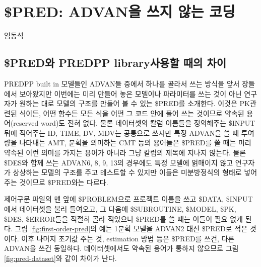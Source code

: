 \documentclass[
  11pt,
  krantz2, a4paper, twoside]{krantz}
\theoremstyle{definition}
\theoremstyle{definition}
\theoremstyle{definition}
\theoremstyle{remark}
\begin{document}
\hypertarget{PRED}{%
\chapter{\$PRED: ADVAN을 쓰지 않는 코딩}\label{PRED}}


\Large\hfill

임동석
\normalsize

\hypertarget{preduxc640-predpp-libraryuxc0acuxc6a9uxd560-uxb54cuxc758-uxcc28uxc774}{%
\section{\$PRED와 PREDPP library사용할 때의 차이}\label{preduxc640-predpp-libraryuxc0acuxc6a9uxd560-uxb54cuxc758-uxcc28uxc774}}


PREDPP built in 모델들인 ADVAN들 중에서 하나를 골라서 쓰는 방식을 앞서 장들에서 보아왔지만 이번에는 미리 만들어 놓은 모델이나 파라미터를 쓰는 것이 아닌 연구자가 원하는 대로 모델의 구조를 만들어 볼 수 있는 \$PRED를 소개한다. 이것은 PK관련된 식이든, 어떤 함수든 모든 식을 어떤 그 코드 안에 풀어 쓰는 것이므로 약속된 용어(reserved word)도 전혀 없다. 물론 데이터셋의 칼럼 이름들을 정의해주는 \$INPUT 뒤에 적어주는 ID, TIME, DV, MDV는 공통으로 쓰지만 특정 ADVAN을 쓸 때 투여량을 나타내는 AMT, 분획을 의미하는 CMT 등의 용어들은 \$PRED를 쓸 때는 미리 약속된 이런 의미를 가지는 용어가 아니라 그냥 칼럼의 제목에 지나지 않는다. 물론 \$DES와 함께 쓰는 ADVAN6, 8, 9, 13의 경우에도 특정 모델에 얽매이지 않고 연구자가 상상하는 모델의 구조를 주고 테스트할 수 있지만 이들은 미분방정식의 형태로 넣어주는 것이므로 \$PRED와는 다르다.

제어구문 파일의 맨 앞에 \$PROBLEM으로 프로젝트 이름을 쓰고 \$DATA, \$INPUT에서 데이터셋을 불러 들여오고, 그 다음에 \$SUBROUTINE, \$MODEL, \$PK, \$DES, \$ERROR들을 적절히 골라 적었으나 \$PRED를 쓸 때는 이들이 필요 없게 된다. 그림 \ref{fig:first-order-pred}의 예는 1분획 모델을 ADVAN2 대신 \$PRED로 적은 것이다. 이후 나머지 초기값 주는 것, estimation 방법 등은 \$PRED를 쓰건, 다른 ADVAN을 쓰건 동일하다. 데이터셋에서도 약속된 용어가 통하지 않으므로 그림 \ref{fig:pred-dataset}와 같이 차이가 난다.
\end{document}
